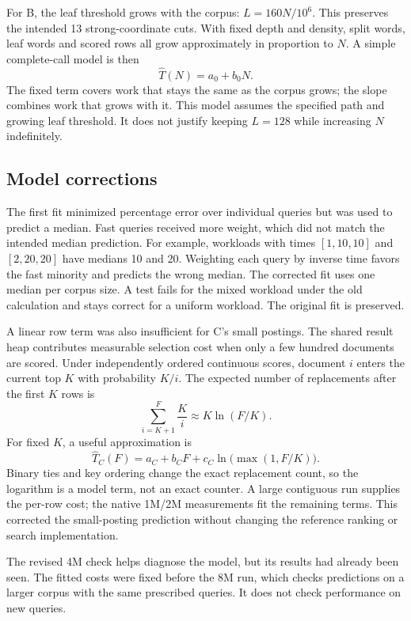 For B, the leaf threshold grows with the corpus: $L=160N/10^6$. This preserves the intended
13 strong-coordinate cuts. With fixed depth and density, split words, leaf words and scored
rows all grow approximately in proportion to $N$. A simple complete-call model is then
\[
\widehat T(N)=a_0+b_0N.
\]
The fixed term covers work that stays the same as the corpus grows; the slope combines
work that grows with it. This model assumes the specified path and growing leaf threshold.
It does not justify keeping $L=128$ while increasing $N$ indefinitely.

\subsection{Model corrections}
The first fit minimized percentage error over individual queries but was used to predict a
median. Fast queries received more weight, which did not match the intended median prediction. For example, workloads
with times $[1,10,10]$ and $[2,20,20]$ have medians 10 and 20. Weighting each query by inverse
time favors the fast minority and predicts the wrong median. The corrected fit uses one median
per corpus size. A test fails for the mixed workload under the old calculation and stays correct
for a uniform workload. The original fit is preserved.

A linear row term was also insufficient for C's small postings. The shared result heap contributes
measurable selection cost when only a few hundred documents are scored. Under independently
ordered continuous scores, document $i$ enters the current top $K$ with probability $K/i$.
The expected number of replacements after the first $K$ rows is
\[
\sum_{i=K+1}^{F}\frac{K}{i}\approx K\ln(F/K).
\]
For fixed $K$, a useful approximation is
\begin{equation}
\widehat T_C(F)=a_C+b_CF+c_C\ln\!\bigl(\max(1,F/K)\bigr).
\label{eq:small-posting-time}
\end{equation}
Binary ties and key ordering change the exact replacement count, so the logarithm is a model
term, not an exact counter. A large contiguous run supplies the per-row cost; the native 1M/2M
measurements fit the remaining terms. This corrected the small-posting prediction without
changing the reference ranking or search implementation.

The revised 4M check helps diagnose the model, but its results had already been seen.
The fitted costs were fixed before the 8M run, which checks predictions on a larger corpus
with the same prescribed queries. It does not check performance on new queries.

